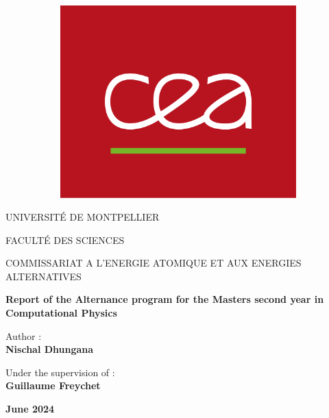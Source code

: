 \begin{figure}[ht]
\begin{subfigure}[b]{0.2\textwidth}
        \includegraphics[width=\textwidth]{images/Logo_cea.png}
    \end{subfigure}
\end{figure}


\begin{center}
\vspace{1.2cm}
\LARGE{UNIVERSITÉ DE MONTPELLIER}
	
\vspace{0.8cm}
\LARGE{FACULTÉ DES SCIENCES}

\vspace{0.8cm}
\LARGE{ COMMISSARIAT A L'ENERGIE ATOMIQUE ET AUX ENERGIES ALTERNATIVES}
	
\vspace{1.7cm}	
\Large
\textbf{Report of the Alternance program for the Masters second year in Computational Physics}

\vspace{1.3cm}
\normalsize	{Author :}\\
\vspace{.3cm}
\large{\textbf{Nischal Dhungana}}
	
\vspace{1.3cm}
\normalsize	{Under the supervision of :} \\
\vspace{.3cm}
\large
\textbf{Guillaume Freychet}

\vspace{1.3cm}
\textbf{June 2024}
\end{center}